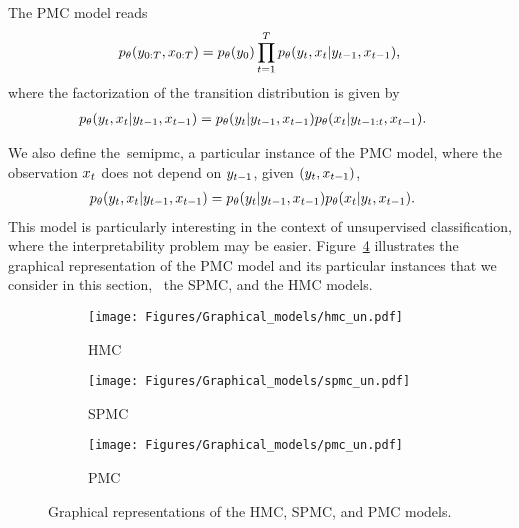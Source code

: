 The PMC model reads
\begin{equation}
  \label{eq:pmc_intro_uns}
  p_{\theta}(y_{0:T},x_{0:T}) = p_{\theta}(y_0)
  \prod_{t=1}^T p_{\theta}(y_t, x_t |y_{t-1}, x_{t-1}) \text{,}
\end{equation}
where  the factorization of the transition distribution is given by
\begin{align}
  \label{eq:pmc_gen}
  p_{\theta}(y_t,x_t|& y_{t-1},x_{t-1}) =
  p_{\theta}(y_t|y_{t-1},x_{t-1})p_{\theta}(x_t|y_{t-1:t},x_{t-1}) \text{.}
\end{align}

We also define the~\gls*{semipmc}, a particular instance of the PMC model, 
where the observation $x_t$ does not depend on $y_{t-1}$, 
given $(y_t,x_{t-1})$, \ie~
\begin{align}
  p_{\theta}(y_t,x_t|& y_{t-1},x_{t-1}) =
   p_{\theta}(y_t|y_{t-1},x_{t-1}) p_{\theta}(x_t|y_t,x_{t-1}) \text{.}
\end{align}
This model is particularly interesting in the context of unsupervised classification, 
where the interpretability problem may be easier.
Figure~\ref{fig:pmc_graphs} illustrates the graphical representation of the PMC model 
and its particular instances that we consider in this section, 
\ie~the SPMC, and the HMC models.

\begin{figure}[htb]
    \begin{subfigure}[b]{0.3\linewidth}
      \centering
      \texttt{[image: Figures/Graphical\_models/hmc\_un.pdf]}
      \caption{HMC}
      \label{fig:dhmcin}
    \end{subfigure}
    \hfill
    \begin{subfigure}[b]{0.3\linewidth}
      \centering
      \texttt{[image: Figures/Graphical\_models/spmc\_un.pdf]}
      \caption{SPMC}
      \label{fig:dpmccn1}
    \end{subfigure}
    \hfill
    \begin{subfigure}[b]{0.3\linewidth}
      \centering
      \texttt{[image: Figures/Graphical\_models/pmc\_un.pdf]}
      \caption{PMC}
      \label{fig:dpmccn2}
    \end{subfigure}
    \caption{Graphical representations of the HMC, SPMC, and PMC models.}
\label{fig:pmc_graphs}

\end{figure}



